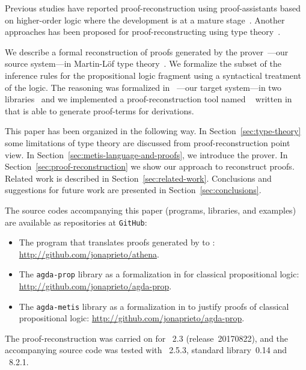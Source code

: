 \documentclass[../main.tex]{subfiles}
\begin{document}
Previous studies have reported proof-reconstruction using
proof-assistants based on higher-order logic where the development is
at a mature
stage~\cite{paulson2010three,hurlin07practical,kaliszyk2013}. Another
approaches has been proposed for proof-reconstructing using type
theory~\cite{Bezem2002,armand2011,Ekici2017,kanso2016light}.

We describe a formal reconstruction of proofs generated by the \Metis
prover~\cite{hurd2003first}---our source system---in Martin-Löf type
theory~\cite{Nordstrom-Petersson-Smith-1990}. We
formalize the subset of the \Metis inference rules for the
propositional logic fragment using a syntactical treatment of the
logic. The \Metis reasoning was formalized in
\Agda~\cite{agdateam}---our target system---in two
libraries~\cite{AgdaProp,AgdaMetis} and we implemented a
proof-reconstruction tool named \Athena~\cite{Athena} written in
\Haskell that is able to generate \Agda proof-terms for \Metis
derivations.

This paper has been organized in the following way.
In Section~\ref{sec:type-theory} some limitations of type theory
are discussed from proof-reconstruction point view.
In Section~\ref{sec:metis-language-and-proofs}, we introduce the
\Metis prover.
In Section~\ref{sec:proof-reconstruction} we show our
approach to reconstruct \Metis proofs.
Related work is described in Section~\ref{sec:related-work}.
Conclusions and suggestions for future work are  presented in
Section~\ref{sec:conclusions}.


The source codes accompanying this paper (programs, libraries, and
examples) are available as repositories at \verb!GitHub!:

\begin{itemize}
  \item The \Athena program that translates proofs generated by \Metis to \Agda:
  \url{http://github.com/jonaprieto/athena}.
  \item The \verb!agda-prop! library as a formalization in \Agda for
    classical propositional logic:
  \url{http://github.com/jonaprieto/agda-prop}.
\item The \verb!agda-metis! library as a formalization in \Agda to
  justify \Metis proofs of classical propositional logic:
  \url{http://github.com/jonaprieto/agda-prop}.
\end{itemize}

The proof-reconstruction was carried on for \Metis~2.3
(release~20170822), and the accompanying source code was tested with
\Agda~2.5.3, \Agda standard library~0.14 and ~8.2.1.
\end{document}
